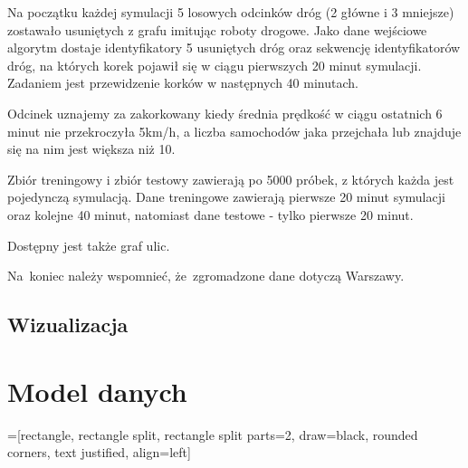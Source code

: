 \documentclass[a4paper,12pt]{mwart}
\begin{document}
Na początku każdej symulacji 5 losowych odcinków dróg (2 główne i 3 mniejsze) zostawało usuniętych z grafu imitując roboty drogowe. Jako dane wejściowe algorytm dostaje identyfikatory 5 usuniętych dróg oraz sekwencję identyfikatorów dróg, na których korek pojawił się w ciągu pierwszych 20 minut symulacji. Zadaniem jest przewidzenie korków w następnych 40 minutach.

Odcinek uznajemy za zakorkowany kiedy średnia prędkość w ciągu ostatnich 6 minut nie przekroczyła 5km/h, a liczba samochodów jaka przejchała lub znajduje się na nim jest większa niż 10.

Zbiór treningowy i zbiór testowy zawierają po 5000 próbek, z których każda jest pojedynczą symulacją. Dane treningowe zawierają pierwsze 20 minut symulacji oraz kolejne 40 minut, natomiast dane testowe - tylko pierwsze 20 minut.

Dostępny jest także graf ulic.

Na~koniec należy wspomnieć, że~zgromadzone dane dotyczą Warszawy.

\subsection{Wizualizacja}

\section{Model danych}

=[rectangle, rectangle split, rectangle split parts=2, draw=black, rounded corners, text justified, align=left]
\end{document}
